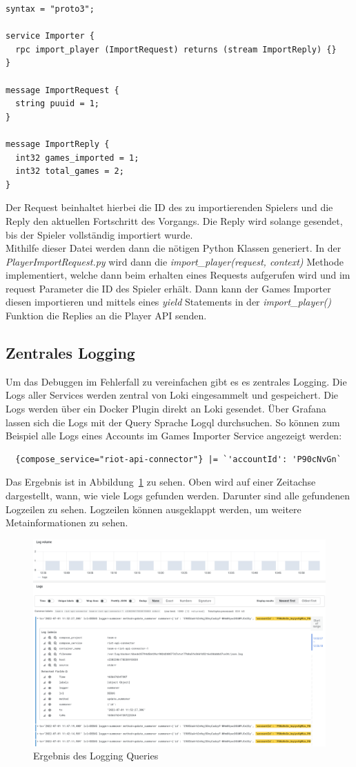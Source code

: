 \begin{lstlisting}
syntax = "proto3";

service Importer {
  rpc import_player (ImportRequest) returns (stream ImportReply) {}
}

message ImportRequest {
  string puuid = 1;
}

message ImportReply {
  int32 games_imported = 1;
  int32 total_games = 2;
}
\end{lstlisting}
Der Request beinhaltet hierbei die ID des zu importierenden Spielers und die Reply den aktuellen Fortschritt des Vorgangs. Die Reply wird solange gesendet, bis der Spieler vollständig importiert wurde.\\
Mithilfe dieser Datei werden dann die nötigen Python Klassen generiert. In der \textit{PlayerImportRequest.py} wird dann die \textit{import\_player(request, context)} Methode implementiert, welche dann beim erhalten eines Requests aufgerufen wird und im request Parameter die ID des Spieler erhält. Dann kann der Games Importer diesen importieren und mittels eines \textit{yield} Statements in der \textit{import\_player()} Funktion die Replies an die Player API senden.

\subsection{Zentrales Logging}

Um das Debuggen im Fehlerfall zu vereinfachen gibt es es zentrales Logging.
Die Logs aller Services werden zentral von Loki eingesammelt und gespeichert.
Die Logs werden über ein Docker Plugin direkt an Loki gesendet.
Über Grafana lassen sich die Logs mit der Query Sprache Logql durchsuchen.
So können zum Beispiel alle Logs eines Accounts im Games Importer Service angezeigt werden:

\begin{lstlisting}
  {compose_service="riot-api-connector"} |= `'accountId': 'P90cNvGn`
\end{lstlisting}

Das Ergebnis ist in Abbildung~\ref{fig:logging} zu sehen.
Oben wird auf einer Zeitachse dargestellt, wann, wie viele Logs gefunden werden.
Darunter sind alle gefundenen Logzeilen zu sehen.
Logzeilen können ausgeklappt werden, um weitere Metainformationen zu sehen.

\begin{figure}
    \centering
    \includegraphics[width=\textwidth]{images/logging}
    \caption{Ergebnis des Logging Queries}
    \label{fig:logging}
\end{figure}